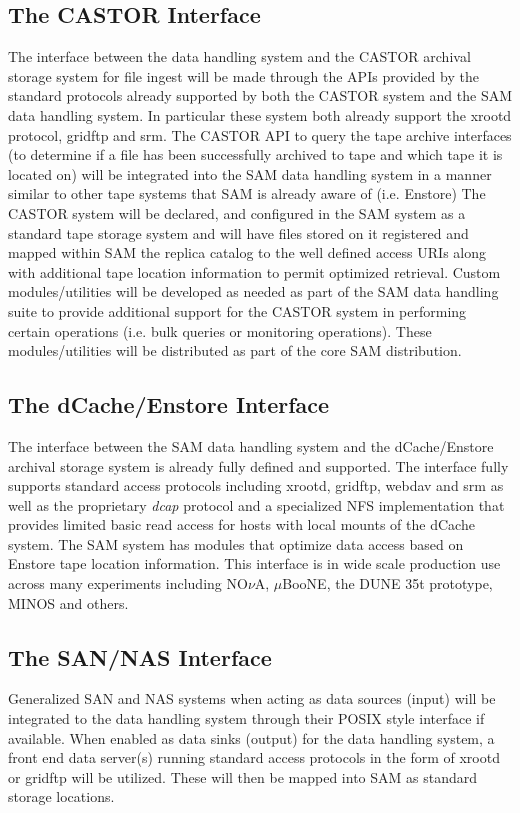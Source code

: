 \documentclass[12pt]{article}
\begin{document}
\subsection{The CASTOR Interface}
The interface between the data handling system and the CASTOR archival storage system for file ingest will be made through the
APIs provided by the standard protocols already supported by both the CASTOR system and the SAM data handling system.
In particular these system both already support the xrootd protocol, gridftp and srm.  The CASTOR API to query the tape archive
interfaces (to determine if a file has been successfully archived to tape and which tape it is located on) will be integrated into the
SAM data handling system in a manner similar to other tape systems that SAM is already aware of (i.e. Enstore)   The CASTOR
system will be declared, and configured in the SAM system as a standard tape storage system and will have files stored on it
registered and mapped within SAM the replica catalog to the well defined access URIs along with additional tape location information
to permit optimized retrieval.  Custom modules/utilities will be developed as needed as part of the SAM data handling suite to provide
additional support for the CASTOR system in performing certain operations (i.e. bulk queries or monitoring operations).
These modules/utilities will be distributed as part of the core SAM distribution.

\subsection{The dCache/Enstore Interface}
The interface between the SAM data handling system and the dCache/Enstore archival storage system is already fully defined and supported.
 The interface fully supports standard access protocols including xrootd, gridftp, webdav and srm as well as the proprietary \textit{dcap} protocol
and a specialized NFS implementation that provides limited basic read access for hosts with local mounts of the dCache system.
The SAM system has modules that optimize data access based on Enstore tape location information.  This interface is in wide scale
production use across many experiments including NO$\nu$A, $\mu$BooNE, the DUNE 35t prototype, MINOS and others.

\subsection{The SAN/NAS Interface}
Generalized SAN and NAS systems when acting as data sources (input) will be integrated to the data handling system through their
POSIX style interface if available.  When enabled as data sinks (output) for the data handling system, a front end data server(s)
running standard access protocols in the form of xrootd or gridftp will be utilized.  These will then be mapped into SAM as standard storage locations.
  
\end{document}
